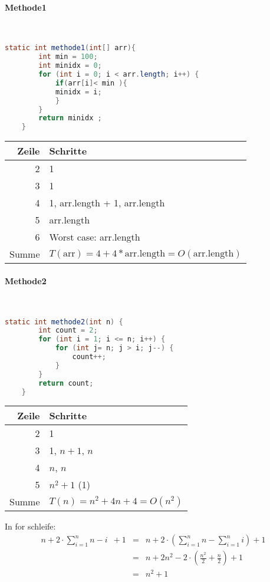 \documentclass{article}
\begin{document}
    \uebungsblattTitel
    \paragraph{Methode1}
    \ \\
    \begin{lstlisting}[language=Java, autogobble]
    static int methode1(int[] arr){
        int min = 100;
        int minidx = 0;
        for (int i = 0; i < arr.length; i++) {
            if(arr[i]< min ){
            minidx = i;
            }
        }
        return minidx ;
    }
    \end{lstlisting}

    \begin{tabular}{r|l}
        Zeile & Schritte \\
        \hline
        2 & 1 \\
        3 & 1 \\
        4 & 1, arr.length + 1, arr.length \\
        5 & arr.length \\
        6 & Worst case: arr.length \\
        \hline
        Summe & $T(\text{arr})=4+4*\text{arr.length} = O(\text{arr.length})$
    \end{tabular}

    \paragraph{Methode2}
    \ \\
    \begin{lstlisting}[language=Java, autogobble]
    static int methode2(int n) {
        int count = 2;
        for (int i = 1; i <= n; i++) {
            for (int j= n; j > i; j--) {
                count++;
            }
        }
        return count;
    }
    \end{lstlisting}

    \begin{tabular}{r|l}
        Zeile & Schritte \\
        \hline
        2 & 1 \\
        3 & 1, $n + 1$, $n$ \\
        4 & $n$, $n$ \\
        5 & $n^2 + 1$ (1)\\
        \hline
        Summe & $T(n)=n^2+4n+4 = O(n^2)$
    \end{tabular}

    \vspace{1cm}
    In for schleife:
    \begin{eqnarray}
        n + 2 \cdot \sum_{i=1}^nn-i \enspace + 1
        &=& n + 2 \cdot \left(\sum_{i=1}^nn - \sum_{i=1}^ni\right) + 1 \nonumber\\
        &=& n + 2n^2 - 2 \cdot \left(\frac{n^2}{2} + \frac{n}{2}\right) +1 \nonumber\\
        &=& n^2 +1
    \end{eqnarray}
\end{document}
